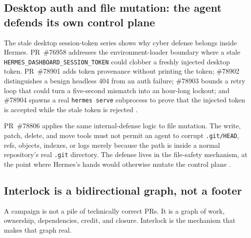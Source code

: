 \documentclass[11pt]{article}
\theoremstyle{definition}
\theoremstyle{plain}
\theoremstyle{remark}
\begin{document}
\subsection{Desktop auth and file mutation: the agent defends its own control plane}

The stale desktop session-token series shows why cyber defense belongs inside
Hermes. PR~\#76958 addresses the environment-loader boundary where a stale
\texttt{HERMES\_DASHBOARD\_SESSION\_TOKEN} could clobber a freshly injected
desktop token. PR~\#78901 adds token provenance without printing the token;
\#78902 distinguishes a benign headless 404 from an auth failure; \#78903
bounds a retry loop that could turn a five-second mismatch into an hour-long
lockout; and \#78904 spawns a real \texttt{hermes serve} subprocess to prove
that the injected token is accepted while the stale token is rejected
\citep{hermespr76958,hermespr78901,hermespr78902,hermespr78903,hermespr78904}.

PR~\#78806 applies the same internal-defense logic to file mutation. The
write, patch, delete, and move tools must not permit an agent to corrupt
\texttt{.git/HEAD}, refs, objects, indexes, or logs merely because the path is
inside a normal repository's real \texttt{.git} directory. The defense lives
in the file-safety mechanism, at the point where Hermes's hands would
otherwise mutate the control plane \citep{hermespr78806}.

\subsection{Interlock is a bidirectional graph, not a footer}
\label{sec:interlock}

A campaign is not a pile of technically correct PRs. It is a graph of work,
ownership, dependencies, credit, and closure. Interlock is the mechanism that
makes that graph real.
\end{document}
